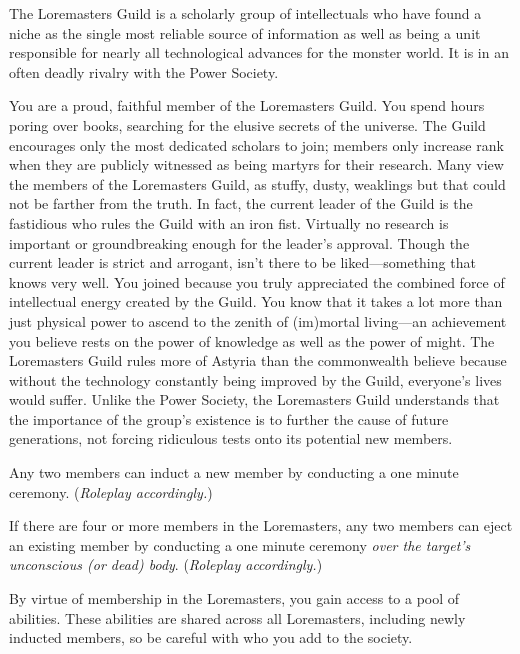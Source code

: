 \documentclass[blue]{guildcamp2}
\begin{document}
\name{\bLoremasters{}}


The Loremasters Guild is a scholarly group of intellectuals who have found a niche as the single most reliable source of information as well as being a unit responsible for nearly all technological advances for the monster world. It is in an often deadly rivalry with the Power Society.

You are a proud, faithful member of the Loremasters Guild. You spend hours poring over books, searching for the elusive secrets of the universe. The Guild encourages only the most dedicated scholars to join; members only increase rank when they are publicly witnessed as being martyrs for their research. Many view the members of the Loremasters Guild, as stuffy, dusty, weaklings but that could not be farther from the truth. In fact, the current leader of the Guild is the fastidious \cVampire{\full} who rules the Guild with an iron fist. Virtually no research is important or groundbreaking enough for the leader's approval. Though the current leader is strict and arrogant, \cVampire{\they} isn't there to be liked---something that \cVampire{\they} knows very well. You joined because you truly appreciated the combined force of intellectual energy created by the Guild. You know that it takes a lot more than just physical power to ascend to the zenith of (im)mortal living---an achievement you believe rests on the power of knowledge as well as the power of might. The Loremasters Guild rules more of Astyria than the commonwealth believe because without the technology constantly being improved by the Guild, everyone's lives would suffer. Unlike the Power Society, the Loremasters Guild understands that the importance of the group's existence is to further the cause of future generations, not forcing ridiculous tests onto its potential new members.

Any two members can induct a new member by conducting a one minute ceremony. (\emph{Roleplay accordingly.})

If there are four or more members in the Loremasters, any two members can eject an existing member by conducting a one minute ceremony \emph{over the target's unconscious (or dead) body}. (\emph{Roleplay accordingly.})

By virtue of membership in the Loremasters, you gain access to a pool of abilities. These abilities are shared across all Loremasters, including newly inducted members, so be careful with who you add to the society.
\end{document}
